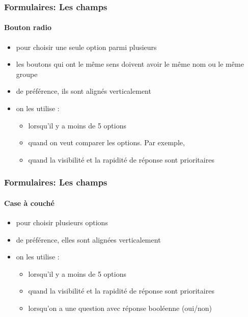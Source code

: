 \documentclass[xcolor=table]{beamer}
\begin{document}
\begin{frame}
\frametitle{Formulaires: Les champs}
\framesubtitle{Bouton radio}

\begin{minipage}{0.59\textwidth}
	\begin{itemize}
		\item pour choisir une seule option parmi plusieurs
	\end{itemize}
\end{minipage}
\begin{minipage}{0.40\textwidth}
\end{minipage}

\begin{itemize}
	\item les boutons qui ont le même sens doivent avoir le même nom ou le même groupe
	\item de préférence, ils sont alignés verticalement 
	\item on les utilise : 
	\begin{itemize}
		\item lorsqu'il y a moins de 5 options 
		\item quand on veut comparer les options. Par exemple, 
		\item quand la visibilité et la rapidité de réponse sont prioritaires
	\end{itemize}
\end{itemize}

\end{frame}

\begin{frame}
\frametitle{Formulaires: Les champs}
\framesubtitle{Case à couché}

\begin{minipage}{0.59\textwidth}
	\begin{itemize}
		\item pour choisir plusieurs options
	\end{itemize}
\end{minipage}
\begin{minipage}{0.40\textwidth}
\end{minipage}

\begin{itemize}
	\item de préférence, elles sont alignées verticalement 
	\item on les utilise : 
	\begin{itemize}
		\item lorsqu'il y a moins de 5 options 
		\item quand la visibilité et la rapidité de réponse sont prioritaires
		\item lorsqu'on a une question avec réponse booléenne (oui/non)
	\end{itemize}
\end{itemize}

\end{frame}
\end{document}
